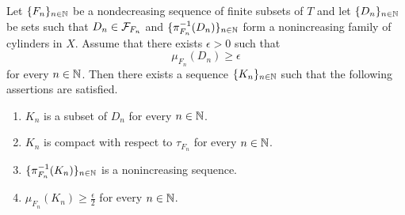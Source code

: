 \begin{lemma}\label{lemma:inner_regularity_in_Daniell_Kolmogorov_extension}
Let $\{F_n\}_{n\in {\mathbb N}}$ be a nondecreasing sequence of finite subsets of $T$ and let $\{D_n\}_{n\in {\mathbb N}}$ be sets such that $D_n\in {\mathcal F}_{F_n}$ and $\{\pi_{F_n}^{-1}(D_n)\}_{n\in {\mathbb N}}$ form a nonincreasing family of cylinders in $X$. Assume that there exists $\epsilon > 0$ such that 
$$\mu_{F_n}(D_n) \geq \epsilon$$
for every $n\in {\mathbb N}$. Then there exists a sequence $\{K_n\}_{n\in {\mathbb N}}$ such that the following assertions are satisfied.
\begin{enumerate}[label=\emph{\textbf{(\arabic*)}}, leftmargin=*]
\item $K_n$ is a subset of $D_n$ for every $n\in {\mathbb N}$.
\item $K_n$ is compact with respect to $\tau_{F_n}$ for every $n\in {\mathbb N}$.
\item $\{\pi^{-1}_{F_n}(K_n)\}_{n\in {\mathbb N}}$ is a nonincreasing sequence.
\item $\mu_{F_n}(K_n) \geq \frac{\epsilon}{2}$ for every $n\in {\mathbb N}$.
\end{enumerate}
\end{lemma}
